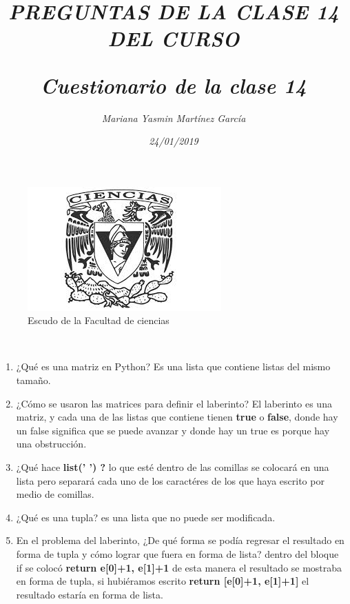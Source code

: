 \documentclass{article}
\title{\Huge\item\color{magenta}\textit{PREGUNTAS DE LA CLASE 14 DEL CURSO}}
\author{\Large\textit{Mariana Yasmin Martínez García}}
\date{\Large\textit{24/01/2019}}
\begin{document}
\begin{figure}[t]
	\centering
	\includegraphics[width=0.7\linewidth]{Imagenes/1}
	\caption{Escudo de la Facultad de ciencias}
	\label{figura:1}
\end{figure}

	\maketitle
		
	\newpage
	
	\title{\huge\color{magenta}\textbf{\textit{Cuestionario de la clase 14}}} \\
	\begin{enumerate}
		 
		 \item{\Large\color{purple} ¿Qué es una matriz en Python? } Es una lista que contiene listas del mismo tamaño.
		 \item{\Large\color{purple} ¿Cómo se usaron las matrices para definir el laberinto? } El laberinto es una matriz, y cada una de las listas que contiene tienen \textbf{true} o \textbf{false}, donde hay un false significa que se puede avanzar y donde hay un true es porque hay una obstrucción. 
		 \item{\Large\color{purple} ¿Qué hace \textbf{list(' ') ? }} lo que esté dentro de las comillas se colocará en una lista pero separará cada uno de los caractéres de los que haya escrito por medio de comillas.
		  \item{\Large\color{purple} ¿Qué es una tupla? } es una lista que no puede ser modificada.
		   \item{\Large\color{purple} En el problema del laberinto, ¿De qué forma se podía regresar el resultado en forma de tupla y cómo lograr que fuera en forma de lista?} dentro del bloque if se colocó \textbf{return e[0]+1, e[1]+1} de esta manera el resultado se mostraba en forma de tupla, si hubiéramos escrito \textbf{return [e[0]+1, e[1]+1]} el resultado estaría en forma de lista.
	\end{enumerate}
	
\end{document}
